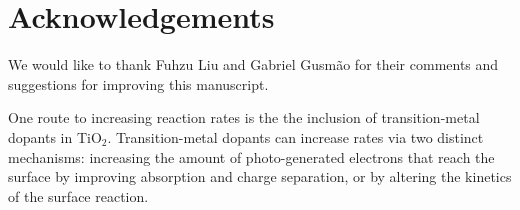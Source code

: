 \section{Acknowledgements}
We would like to thank Fuhzu Liu and Gabriel Gusm\~ao for their comments and suggestions for improving this manuscript.



\appendix


One route to increasing reaction rates is the the inclusion of transition-metal dopants in TiO$_2$. Transition-metal dopants can increase rates via two distinct mechanisms: increasing the amount of photo-generated electrons that reach the surface by improving absorption and charge separation, or by altering the kinetics of the surface reaction.

